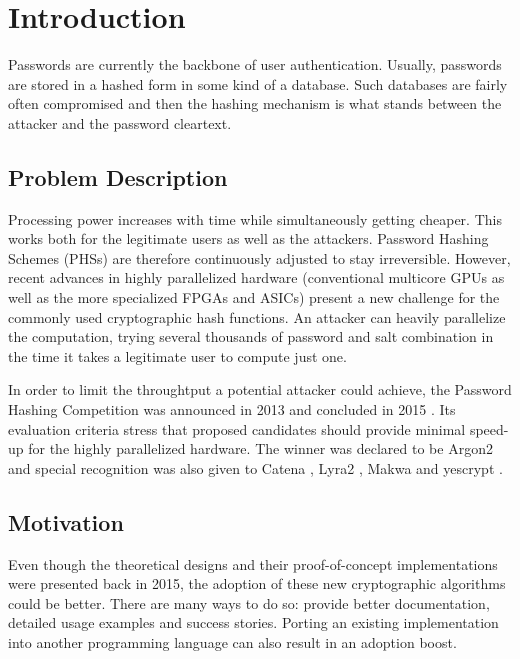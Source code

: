 \chapter{Introduction}
\label{sec:introduction}
Passwords are currently the backbone of user authentication. Usually, passwords are stored in a hashed form in some kind of a database. Such databases are fairly often compromised and then the hashing mechanism is what stands between the attacker and the password cleartext.

\section{Problem Description}
Processing power increases with time while simultaneously getting cheaper. This works both for the legitimate users as well as the attackers. Password Hashing Schemes (PHSs) are therefore continuously adjusted to stay irreversible. However, recent advances in highly parallelized hardware (conventional multicore GPUs as well as the more specialized FPGAs and ASICs) present a new challenge for the commonly used cryptographic hash functions. An attacker can heavily parallelize the computation, trying several thousands of password and salt combination in the time it takes a legitimate user to compute just one.

In order to limit the throughtput a potential attacker could achieve, the Password Hashing Competition was announced in 2013 and concluded in 2015 \cite{wetzels:2016:phc}. Its evaluation criteria stress that proposed candidates should provide minimal speed-up for the highly parallelized hardware. The winner was declared to be Argon2 \cite{biryukov:2015:argon2} and special recognition was also given to Catena \cite{forler:2013:catena}, Lyra2 \cite{andrade:2016:lyra2,marcos:2015:lyra2}, Makwa \cite{pornin:2015:makwa} and yescrypt \cite{peslyak:2015:yescrypt}.

\section{Motivation}
Even though the theoretical designs and their proof-of-concept implementations were presented back in 2015, the adoption of these new cryptographic algorithms could be better. There are many ways to do so: provide better documentation, detailed usage examples and success stories. Porting an existing implementation into another programming language can also result in an adoption boost.

